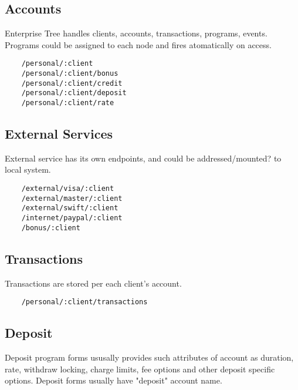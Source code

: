 \subsection{Accounts}

Enterprise Tree handles clients, accounts, transactions, programs, events.
Programs could be assigned to each node and fires atomatically on access.

\vspace{1\baselineskip}
\begin{lstlisting}
    /personal/:client
    /personal/:client/bonus
    /personal/:client/credit
    /personal/:client/deposit
    /personal/:client/rate
\end{lstlisting}
\vspace{1\baselineskip}

\subsection{External Services}

External service has its own endpoints, and could be
addressed/mounted? to local system.

\vspace{1\baselineskip}
\begin{lstlisting}
    /external/visa/:client
    /external/master/:client
    /external/swift/:client
    /internet/paypal/:client
    /bonus/:client
\end{lstlisting}
\vspace{1\baselineskip}

\subsection{Transactions}

Transactions are stored per each client's account.

\vspace{1\baselineskip}
\begin{lstlisting}
    /personal/:client/transactions
\end{lstlisting}
\vspace{1\baselineskip}

\subsection{Deposit}

Deposit program forms ususally provides such attributes of
account as duration, rate, withdraw locking, charge
limits, fee options and other deposit specific options.
Deposit forms usually have "deposit" account name.



